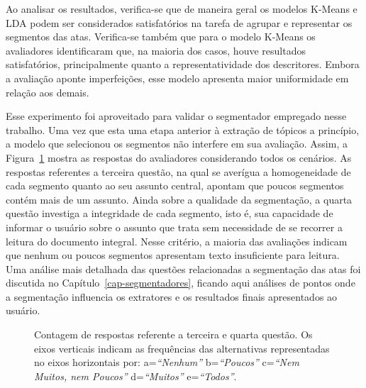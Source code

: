 Ao analisar os resultados, verifica-se que de maneira geral os modelos K-Means e LDA podem ser considerados satisfatórios na tarefa de agrupar e representar os segmentos das atas.
Verifica-se também que para o modelo K-Means os avaliadores identificaram que, na maioria dos casos, houve resultados satisfatórios, principalmente quanto a representatividade dos descritores. Embora a avaliação aponte imperfeições, esse modelo apresenta maior uniformidade em relação aos demais.


Esse experimento foi aproveitado para validar o segmentador empregado nesse trabalho. Uma vez que esta uma etapa anterior à extração de tópicos a princípio, a modelo que selecionou os segmentos não interfere em sua avaliação. Assim, a Figura~\ref{fig:Q3e4} mostra as respostas do avaliadores considerando todos os cenários. As respostas referentes a terceira questão, na qual se averígua a homogeneidade de cada segmento quanto ao seu assunto central, apontam que poucos segmentos contém mais de um assunto.
Ainda sobre a qualidade da segmentação, a quarta questão investiga a integridade de cada segmento, isto é, sua capacidade de informar o usuário sobre o assunto que trata sem necessidade de se recorrer a leitura do documento integral. Nesse critério, a maioria das avaliações indicam que nenhum ou poucos segmentos apresentam texto insuficiente para leitura.  Uma análise mais detalhada das questões relacionadas a segmentação das atas foi discutida no Capítulo~\ref{cap-segmentadores}, ficando aqui análises de pontos onde a segmentação influencia os extratores e os resultados finais apresentados ao usuário.


\begin{figure}[!h] \centering     %

	\caption{Contagem de respostas referente a terceira e quarta questão. Os eixos verticais indicam as frequências das alternativas representadas no eixos horizontais por:
		a=\textit{``Nenhum''}
		b=\textit{``Poucos''}
		c=\textit{``Nem Muitos, nem Poucos''}
		d=\textit{``Muitos''}
		e=\textit{``Todos''}.
	}
	\label{fig:Q3e4}
\end{figure}


